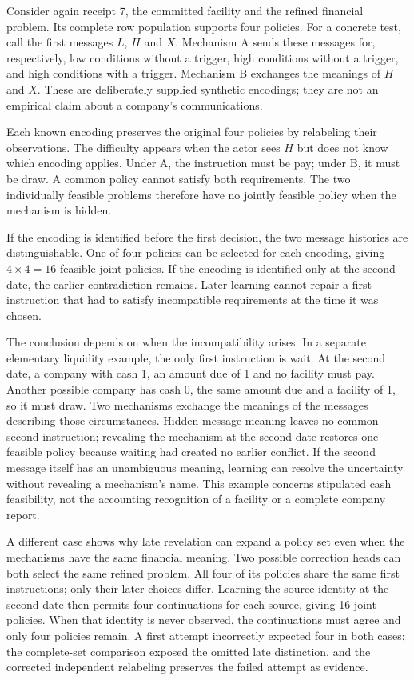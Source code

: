 Consider again receipt 7, the committed facility and the refined financial problem. Its complete row population supports four policies. For a concrete test, call the first messages $L$, $H$ and $X$. Mechanism A sends these messages for, respectively, low conditions without a trigger, high conditions without a trigger, and high conditions with a trigger. Mechanism B exchanges the meanings of $H$ and $X$. These are deliberately supplied synthetic encodings; they are not an empirical claim about a company's communications.

Each known encoding preserves the original four policies by relabeling their observations. The difficulty appears when the actor sees $H$ but does not know which encoding applies. Under A, the instruction must be pay; under B, it must be draw. A common policy cannot satisfy both requirements. The two individually feasible problems therefore have no jointly feasible policy when the mechanism is hidden.

If the encoding is identified before the first decision, the two message histories are distinguishable. One of four policies can be selected for each encoding, giving $4\times4=16$ feasible joint policies. If the encoding is identified only at the second date, the earlier contradiction remains. Later learning cannot repair a first instruction that had to satisfy incompatible requirements at the time it was chosen.

The conclusion depends on when the incompatibility arises. In a separate elementary liquidity example, the only first instruction is wait. At the second date, a company with cash 1, an amount due of 1 and no facility must pay. Another possible company has cash 0, the same amount due and a facility of 1, so it must draw. Two mechanisms exchange the meanings of the messages describing those circumstances. Hidden message meaning leaves no common second instruction; revealing the mechanism at the second date restores one feasible policy because waiting had created no earlier conflict. If the second message itself has an unambiguous meaning, learning can resolve the uncertainty without revealing a mechanism's name. This example concerns stipulated cash feasibility, not the accounting recognition of a facility or a complete company report.

A different case shows why late revelation can expand a policy set even when the mechanisms have the same financial meaning. Two possible correction heads can both select the same refined problem. All four of its policies share the same first instructions; only their later choices differ. Learning the source identity at the second date then permits four continuations for each source, giving 16 joint policies. When that identity is never observed, the continuations must agree and only four policies remain. A first attempt incorrectly expected four in both cases; the complete-set comparison exposed the omitted late distinction, and the corrected independent relabeling preserves the failed attempt as evidence.

